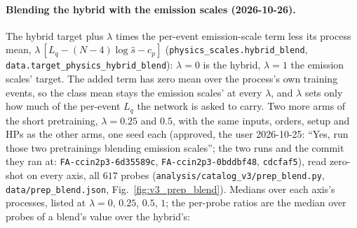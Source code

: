 \documentclass[11pt]{article}
\newcommand{\code}[1]{\texttt{#1}}
\begin{document}
\paragraph{Blending the hybrid with the emission scales (2026-10-26).} The hybrid target plus $\lambda$ times the
per-event emission-scale term less its process mean, $\lambda\,[L_q-(N-4)\log\hat s-c_p]$
(\code{physics\_scales.hybrid\_blend}, \code{data.target\_physics\_hybrid\_blend}): $\lambda=0$ is the hybrid,
$\lambda=1$ the emission scales' target. The added term has zero mean over the process's own training events, so the
class mean stays the emission scales' at every $\lambda$, and $\lambda$ sets only how much of the per-event $L_q$ the
network is asked to carry. Two more arms of the short pretraining, $\lambda=0.25$ and $0.5$, with the same inputs,
orders, setup and HPs as the other arms, one seed each (approved, the user 2026-10-25: ``Yes, run those two
pretrainings blending emission scales''; the two runs and the commit they ran at: \code{FA-ccin2p3-6d35589c},
\code{FA-ccin2p3-0bddbf48}, \code{cdcfaf5}), read
zero-shot on every axis, all $617$ probes (\code{analysis/catalog\_v3/prep\_blend.py}, \code{data/prep\_blend.json},
Fig.~\ref{fig:v3_prep_blend}). Medians over each axis's processes, listed at $\lambda=0$, $0.25$, $0.5$, $1$; the
per-probe ratios are the median over probes of a blend's value over the hybrid's:
\end{document}
